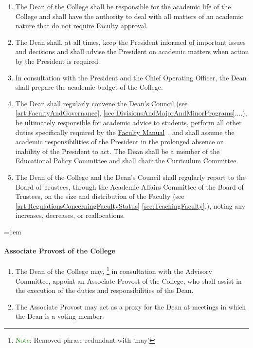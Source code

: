 \documentclass{manual}
\newcommand{\keyword}[1]{\textcolor{black}{#1}}
\newcommand{\facman}{\keyword{\underline{Faculty Manual}}~}
\let\oldparagraph\paragraph
\renewcommand\paragraph{\leftskip=1em\oldparagraph}
\newcommand{\editRemark}[3]{\textcolor{green}{#2}\footnote{\textcolor{green}{#1}: #3}}
\newcommand{\editNote}[1]{\editRemark{Note}{}{#1}}
\newcommand{\editRemove}[1]{}
\newcommand{\itemLevelA}{\alph*.}
\newcommand{\itemRefA}{\alph*}
\begin{document}
\begin{enumerate}[label=\itemLevelA,ref=\itemRefA]
\item The Dean of the College shall be responsible for the academic life of the College and shall have the authority to deal with all matters of an academic nature that do not require Faculty approval.
\item The Dean shall, at all times, keep the President informed of important issues and decisions and shall advise the President on academic matters when action by the President is required.
\item In consultation with the President and the Chief Operating Officer, the Dean shall prepare the academic budget of the College.
\item The Dean shall regularly convene the Dean's Council (see \cref{art:FacultyAndGovernance}, \cref{sec:DivisionsAndMajorAndMinorPrograms}....), be ultimately responsible for academic advice to students, perform all other duties specifically required by the \facman, and shall assume the academic responsibilities of the President in the prolonged absence or inability of the President to act. The Dean shall be a member of the Educational Policy Committee and shall chair the Curriculum Committee.
\item The Dean of the College and the Dean's Council shall regularly report to the Board of Trustees, through the Academic Affairs Committee of the Board of Trustees, on the size and distribution of the Faculty (see \cref{art:RegulationsConcerningFacultyStatus} \cref{sec:TeachingFaculty}.), noting any increases, decreases, or reallocations.
\end{enumerate}

\paragraph{Associate Provost of the College}
\begin{enumerate}[label=\itemLevelA,ref=\itemRefA]
\item The Dean of the College may, \editRemove{at their discretion, and}\editNote{Removed phrase redundant with `may'} in consultation with the Advisory Committee, appoint an Associate Provost of the College, who shall assist in the execution of the duties and responsibilities of the Dean.
\item The Associate Provost may act as a proxy for the Dean at meetings in which the Dean is a voting member.
\end{enumerate}
\end{document}
